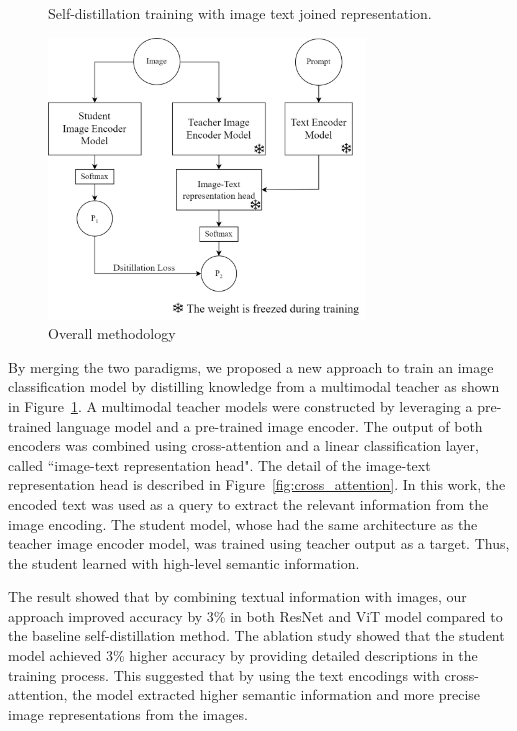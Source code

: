 \begin{figure}[h]
    \caption{Overall methodology}
    \label{fig:overall_method}
    Self-distillation training with image text joined representation.
    \begin{center}
        \includegraphics[width=0.75\textwidth]{Images/OverviewMethod.png}
    \end{center}
    \small
\end{figure}

By merging the two paradigms, we proposed a new approach to train an image classification model by distilling knowledge from a multimodal teacher as shown in Figure~\ref{fig:overall_method}.
A multimodal teacher models were constructed by leveraging a pre-trained language model and a pre-trained image encoder.
The output of both encoders was combined using cross-attention and a linear classification layer, called ``image-text representation head".
The detail of the image-text representation head is described in Figure~\ref{fig:cross_attention}.
In this work, the encoded text was used as a query to extract the relevant information from the image encoding.
The student model, whose had the same architecture as the teacher image encoder model, was trained using teacher output as a target.
Thus, the student learned with high-level semantic information.

The result showed that by combining textual information with images, our approach improved accuracy by 3\% in both ResNet  and ViT  model compared to the baseline self-distillation method.
The ablation study showed that the student model achieved 3\% higher accuracy by providing detailed descriptions in the training process.
This suggested that by using the text encodings with cross-attention, the model extracted higher semantic information and more precise image representations from the images.

